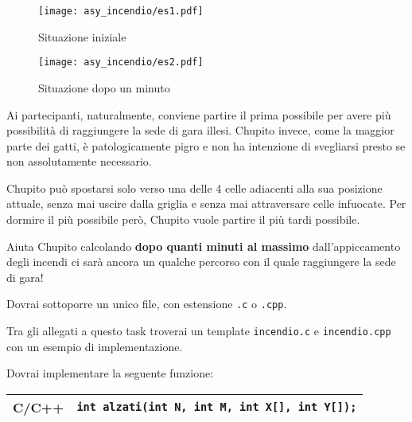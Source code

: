\begin{figure}[h]
    \begin{center}
  \begin{minipage}{0.45\linewidth}
    \texttt{[image: asy\_incendio/es1.pdf]}
    \caption*{Situazione iniziale}
  \end{minipage}
  \hspace{0.05\linewidth}
  \begin{minipage}{0.45\linewidth}
    \texttt{[image: asy\_incendio/es2.pdf]}
    \caption*{Situazione dopo un minuto}
  \end{minipage}
  \end{center}
\end{figure}

Ai partecipanti, naturalmente, conviene partire il prima possibile per avere più
possibilità di raggiungere la sede di gara illesi. Chupito invece, come la
maggior parte dei gatti, è patologicamente pigro e non ha intenzione di
svegliarsi presto se non assolutamente necessario.

Chupito può spostarsi solo verso una delle $4$ celle adiacenti alla sua posizione attuale, senza mai uscire dalla griglia e senza mai attraversare celle infuocate. Per dormire il più possibile però, Chupito vuole partire il più tardi possibile.

Aiuta Chupito calcolando \textbf{dopo quanti minuti al massimo} dall'appiccamento degli incendi ci sarà ancora un qualche percorso con il quale raggiungere la sede di gara!


\pagebreak
\Implementation

Dovrai sottoporre un unico file, con estensione \texttt{.c} o \texttt{.cpp}.

\begin{warning}
Tra gli allegati a questo task troverai un template \texttt{incendio.c} e \texttt{incendio.cpp}
con un esempio di implementazione.
\end{warning}

Dovrai implementare la seguente funzione:

\begin{center}\begin{tabularx}{\textwidth}{|c|X|}
\hline
C/C++  & \verb|int alzati(int N, int M, int X[], int Y[]);|\\
\hline
\end{tabularx}\end{center}

